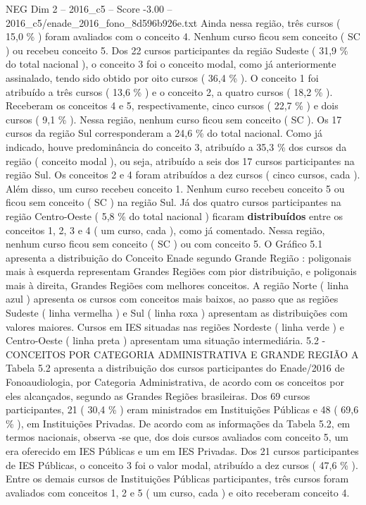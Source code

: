 \begin{textsample}{NEG Dim 2 – 2016\_c5 – Score -3.00 – 2016\_c5/enade\_2016\_fono\_8d596b926e.txt}
Ainda nessa região, três cursos ( 15,0 \% ) foram avaliados com o conceito 4.
Nenhum curso ficou sem conceito ( SC ) ou recebeu conceito 5.
Dos 22 cursos participantes da região Sudeste ( 31,9 \% do total nacional ), o conceito 3 foi o conceito modal, como já anteriormente assinalado, tendo sido obtido por oito cursos ( 36,4 \% ).
O conceito 1 foi atribuído a três cursos ( 13,6 \% ) e o conceito 2, a quatro cursos ( 18,2 \% ).
Receberam os conceitos 4 e 5, respectivamente, cinco cursos ( 22,7 \% ) e dois cursos ( 9,1 \% ).
Nessa região, nenhum curso ficou sem conceito ( SC ).
Os 17 cursos da região Sul corresponderam a 24,6 \% do total nacional.
Como já indicado, houve predominância do conceito 3, atribuído a 35,3 \% dos cursos da região ( conceito modal ), ou seja, atribuído a seis dos 17 cursos participantes na região Sul.
Os conceitos 2 e 4 foram atribuídos a dez cursos ( cinco cursos, cada ).
Além disso, um curso recebeu conceito 1.
Nenhum curso recebeu conceito 5 ou ficou sem conceito ( SC ) na região Sul.
Já dos quatro cursos participantes na região Centro-Oeste ( 5,8 \% do total nacional ) ficaram \textbf{distribuídos} entre os conceitos 1, 2, 3 e 4 ( um curso, cada ), como já comentado.
Nessa região, nenhum curso ficou sem conceito ( SC ) ou com conceito 5.
O Gráfico 5.1 apresenta a distribuição do Conceito Enade segundo Grande Região : poligonais mais à esquerda representam Grandes Regiões com pior distribuição, e poligonais mais à direita, Grandes Regiões com melhores conceitos.
A região Norte ( linha azul ) apresenta os cursos com conceitos mais baixos, ao passo que as regiões Sudeste ( linha vermelha ) e Sul ( linha roxa ) apresentam as distribuições com valores maiores.
Cursos em IES situadas nas regiões Nordeste ( linha verde ) e Centro-Oeste ( linha preta ) apresentam uma situação intermediária. 5.2 - CONCEITOS POR CATEGORIA ADMINISTRATIVA E GRANDE REGIÃO A Tabela 5.2 apresenta a distribuição dos cursos participantes do Enade/2016 de Fonoaudiologia, por Categoria Administrativa, de acordo com os conceitos por eles alcançados, segundo as Grandes Regiões brasileiras.
Dos 69 cursos participantes, 21 ( 30,4 \% ) eram ministrados em Instituições Públicas e 48 ( 69,6 \% ), em Instituições Privadas.
De acordo com as informações da Tabela 5.2, em termos nacionais, observa -se que, dos dois cursos avaliados com conceito 5, um era oferecido em IES Públicas e um em IES Privadas.
Dos 21 cursos participantes de IES Públicas, o conceito 3 foi o valor modal, atribuído a dez cursos ( 47,6 \% ).
Entre os demais cursos de Instituições Públicas participantes, três cursos foram avaliados com conceitos 1, 2 e 5 ( um curso, cada ) e oito receberam conceito 4.

\end{textsample}
